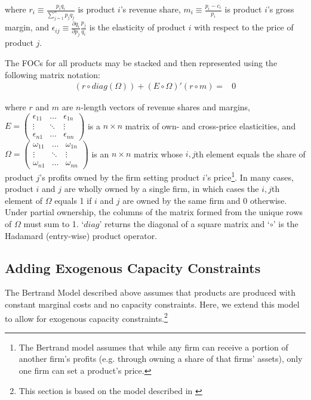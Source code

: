 \documentclass[11pt,numbers=noenddot,pointlessnumbers]{scrreprt}
\numberwithin{equation}{section}
\begin{document}
where $r_i\equiv\frac{p_iq_i}{\sum\limits_{j=1}^np_jq_j}$ is
product $i$'s revenue share, $m_i\equiv\frac{p_i-c_i}{p_i}$ is product
$i$'s gross margin, and $\epsilon_{ij}\equiv\frac{\partial q_i}{\partial
  p_j}\frac{p_j}{q_i}$  is the elasticity of product $i$ with
respect to the price of product $j$.

The FOCs for all products may be stacked and then
represented using the following matrix notation:
\begin{align}
  \label{eqn:FOC}
  (r\circ diag(\Omega)) + (E\circ\Omega)'(r \circ m)=&0
\end{align}

where $r$ and $m$ are $n$-length vectors of revenue shares
and margins, $E = \left(\begin{smallmatrix}
    \epsilon_{11}&\ldots&\epsilon_{1n}\\\vdots
    &\ddots&\vdots\\\epsilon_{n1}&\ldots&\epsilon_{nn} \end{smallmatrix}\right)$
is a $n \times n$ matrix of own- and cross-price elasticities, and
$\Omega=\left(\begin{smallmatrix}
    \omega_{11}&\ldots&\omega_{1n}\\\vdots
    &\ddots&\vdots\\\omega_{n1}&\ldots&\omega_{nn} \end{smallmatrix}\right)$
is an $n \times n$ matrix whose $i,j$th element equals
the share of product $j$'s profits owned by the firm setting product $i$'s
price\footnote{The Bertrand model assumes that while any firm can
  receive a portion of another firm's profits (e.g. through owning a
  share of that firms' assets), only one firm can set a product's
  price.}.  In many cases,
product $i$ and $j$ are wholly owned by a single firm, in which cases the $i,j$th
element of $\Omega$ equals 1 if $i$ and $j$ are owned by the same firm
and 0 otherwise. Under partial ownership, the columns of the matrix formed from the
unique rows of $\Omega$ must sum to 1.
`$diag$' returns the diagonal of a square matrix and `$\circ$' is the Hadamard (entry-wise) product operator.


\subsection{Adding Exogenous Capacity Constraints}
The Bertrand Model described above assumes that products are produced
with constant marginal costs and no capacity constraints. Here, we
extend this model to allow for exogenous capacity
constraints.\footnote{This section is based on the model described in \citet[p.~51-55]{Froeb2003} }
\end{document}
